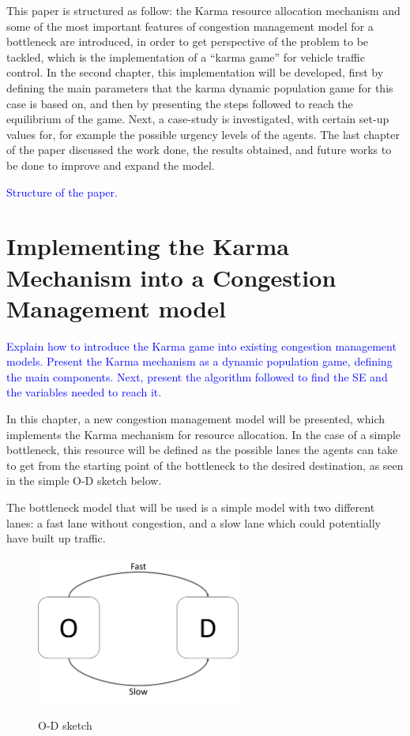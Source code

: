 \documentclass[a4paper,11pt,twoside]{book}
\begin{document}
This paper is structured as follow: the Karma resource allocation mechanism and some of the most important features of congestion management model for a bottleneck are introduced, in order to get perspective of the problem to be tackled, which is the implementation of a ``karma game'' for vehicle traffic control. In the second chapter, this implementation will be developed, first by defining the main parameters that the karma dynamic population game for this case is based on, and then by presenting the steps followed to reach the equilibrium of the game. Next, a case-study is investigated, with certain set-up values for, for example the possible urgency levels of the agents. The last chapter of the paper discussed the work done, the results obtained, and future works to be done to improve and expand the model.

\textcolor{blue}{Structure of the paper.}

\chapter{Implementing the Karma Mechanism into a Congestion Management model}

\textcolor{blue}{Explain how to introduce the Karma game into existing congestion management models. Present the Karma mechanism as a dynamic population game, defining the main components. Next, present the algorithm followed to find the SE and the variables needed to reach it.}


In this chapter, a new congestion management model will be presented, which implements the Karma mechanism for resource allocation. In the case of a simple bottleneck, this resource will be defined as the possible lanes the agents can take to get from the starting point of the bottleneck to the desired destination, as seen in the simple O-D sketch below.

The bottleneck model that will be used is a simple model with two different lanes: a fast lane without congestion, and a slow lane which could potentially have built up traffic.

\begin{figure}[h]
     \centering
     \includegraphics[width=0.6\textwidth]{reporttemplate/graphics/OD-pic2.png}\\
     \caption{O-D sketch}\label{fig:od_sketch}
\end{figure}
\end{document}
